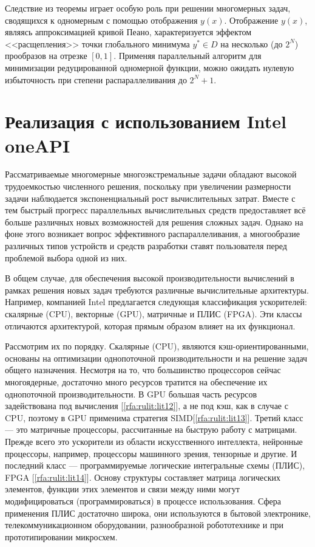 \documentclass[10pt,a4paper]{book}
\begin{document}
Следствие из теоремы играет особую роль при решении многомерных задач, сводящихся к одномерным с помощью отображения $y(x)$. Отображение $y(x)$, являясь аппроксимацией кривой Пеано, характеризуется эффектом <<расщепления>> точки глобального минимума $y^* \in D$ на несколько (до $2^N$) прообразов на отрезке $[0,1]$. Применяя параллельный алгоритм для минимизации редуцированной одномерной функции, можно ожидать нулевую избыточность при степени распараллеливания до $2^N+1$.


\section{Реализация с использованием Intel oneAPI}


Рассматриваемые многомерные многоэкстремальные задачи обладают высокой трудоемкостью численного решения, поскольку при увеличении размерности задачи наблюдается экспоненциальный рост вычислительных затрат. Вместе с тем быстрый прогресс параллельных вычислительных средств предоставляет всё больше различных новых возможностей для решения сложных задач. Однако на фоне этого возникает вопрос эффективного распараллеливания, а многообразие различных типов устройств и средств разработки ставят пользователя перед проблемой выбора одной из них.

В общем случае, для обеспечения высокой производительности вычислений в рамках решения новых задач требуются различные вычислительные архитектуры. Например, компанией Intel предлагается следующая классификация ускорителей: скалярные (CPU), векторные (GPU), матричные и ПЛИС (FPGA). Эти классы отличаются архитектурой, которая прямым образом влияет на их функционал.
 
Рассмотрим их по порядку. Скалярные (CPU), являются кэш-ориентированными, основаны на оптимизации однопоточной производительности и на решение задач общего назначения. Несмотря на то, что большинство процессоров сейчас многоядерные, достаточно много ресурсов тратится на обеспечение их однопоточной производительности. В GPU большая часть ресурсов задействована под вычисления [\ref{rfa:rulit:lit12}], а не под кэш, как в случае с CPU, поэтому в GPU применима стратегия SIMD[\ref{rfa:rulit:lit13}].   Третий класс --- это матричные процессоры, рассчитанные на быструю работу с матрицами. Прежде всего это ускорители из области искусственного интеллекта, нейронные процессоры, например, процессоры машинного зрения, тензорные и другие. И последний класс --- программируемые логические интегральные схемы (ПЛИС), FPGA [\ref{rfa:rulit:lit14}]. Основу структуры составляет матрица логических элементов, функции этих элементов и связи между ними могут модифицироваться (программироваться) в процессе использования. Сфера применения ПЛИС достаточно широка, они используются в бытовой электронике, телекоммуникационном оборудовании, разнообразной робототехнике и при прототипировании микросхем.
\end{document}

